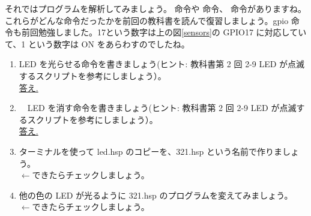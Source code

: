 それではプログラムを解析してみましょう。 命令や  命令、  命令がありますね。これらがどんな命令だったかを前回の教科書を読んで復習しましょう。gpio 命令も前回勉強しました。17という数字は上の図\ref{sensors}の GPIO17 に対応していて、1 という数字は ON をあらわすのでしたね。\\

\begin{tcolorbox}[title=\useOmetoi]
\begin{enumerate}
\item LED を光らせる命令を書きましょう(ヒント: 教科書第 2 回 2-9 LED が点滅するスクリプトを参考にしましょう）。\\
\underline{答え.\hspace{0.8\linewidth}}
\item　LED を消す命令を書きましょう(ヒント: 教科書第 2 回 2-9 LED が点滅するスクリプトを参考にしましょう）。\\
\underline{答え.\hspace{0.8\linewidth}}
\item ターミナルを使って led.hsp のコピーを、321.hsp という名前で作りましょう。\\
\fbox{\phantom{白}} $\leftarrow$できたらチェックしましょう。
\item 他の色の LED が光るように 321.hsp のプログラムを変えてみましょう。\\
\fbox{\phantom{白}} $\leftarrow$できたらチェックしましょう。
\end{enumerate}
\end{tcolorbox}


